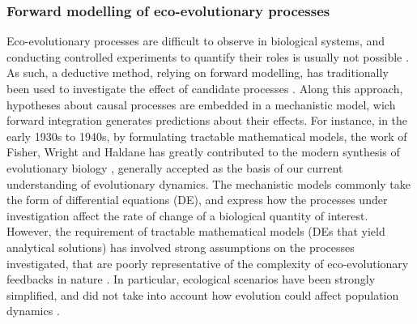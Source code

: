 \subsubsection*{Forward modelling of eco-evolutionary processes}

Eco-evolutionary processes are difficult to observe in biological systems, and conducting controlled experiments to quantify their roles is usually not possible \cite{Pontarp2019}. As such, a deductive method, relying on forward modelling, has traditionally been used to investigate the effect of candidate processes \cite{Brummitt2020}. Along this approach, hypotheses about causal processes are embedded in a mechanistic model, wich forward integration generates predictions about their effects. %
% 
For instance, in the early 1930s to 1940s, by formulating tractable mathematical models, the work of Fisher, Wright and Haldane has greatly contributed to the modern synthesis of evolutionary biology \cite{huxley1942evolution}, generally accepted as the basis of our current understanding of evolutionary dynamics. 
% 
The mechanistic models commonly take the form of differential equations (DE), and express how the processes under investigation affect the rate of change of a biological quantity of interest. 
% 
However, the requirement of tractable mathematical models (DEs that yield analytical solutions) has involved strong assumptions on the processes investigated, that are poorly representative of the complexity of eco-evolutionary feedbacks in nature \cite{Govaert2019a}. In particular, ecological scenarios have been strongly simplified, and did not take into account how evolution could affect population dynamics \cite{Lion2022}.

